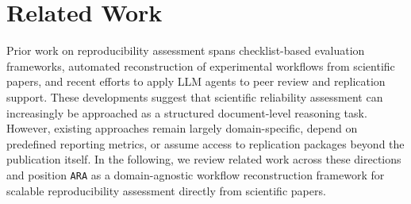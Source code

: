 \documentclass{article}
\begin{document}


\section{Related Work}

Prior work on reproducibility assessment spans checklist-based evaluation frameworks, automated reconstruction of experimental workflows from scientific papers, and recent efforts to apply LLM agents to peer review and replication support. 
These developments suggest that scientific reliability assessment can increasingly be approached as a structured document-level reasoning task. 
However, existing approaches remain largely domain-specific, depend on predefined reporting metrics, or assume access to replication packages beyond the publication itself. 
In the following, we review related work across these directions and position \texttt{ARA} as a domain-agnostic workflow reconstruction framework for scalable reproducibility assessment directly from scientific papers.


\end{document}
